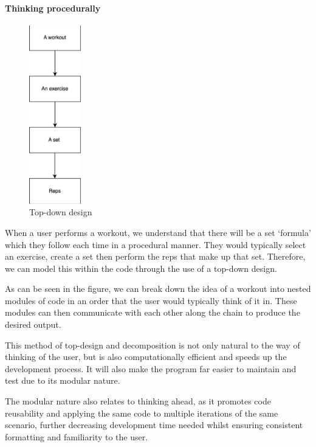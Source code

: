 \documentclass{article}
\begin{document}
\paragraph{Thinking procedurally}
\begin{figure} %
  \includegraphics[width=0.2\textwidth]{img/Figure 2.png}
  \caption{Top-down design}
\end{figure}
When a user performs a workout, we understand that there will be a set ‘formula’ which they follow each time in a procedural manner. They would typically select an exercise, create a set then perform the reps that make up that set. Therefore, we can model this within the code through the use of a top-down design. 

As can be seen in the figure, we can break down the idea of a workout into nested modules of code in an order that the user would typically think of it in. These modules can then communicate with each other along the chain to produce the desired output. 

This method of top-design and decomposition is not only natural to the way of thinking of the user, but is also computationally efficient and speeds up the development process. It will also make the program far easier to maintain and test due to its modular nature. 

The modular nature also relates to thinking ahead, as it promotes code reusability and applying the same code to multiple iterations of the same scenario, further decreasing development time needed whilst ensuring consistent formatting and familiarity to the user. 
\end{document}
